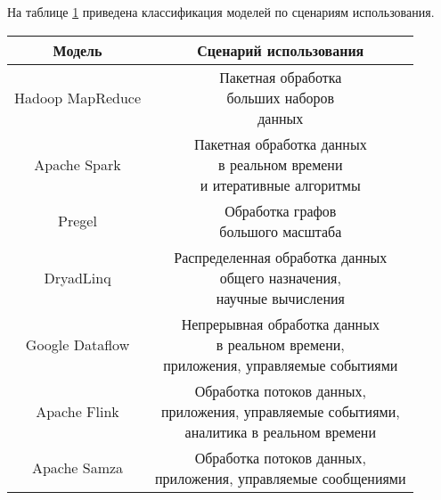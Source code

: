 \clearpage

На таблице \ref{tab:class_models5} приведена классификация моделей по сценариям использования.

\begin{table}[H]\centering
	\captionsetup{justification=raggedright,singlelinecheck=off}
	\label{tab:class_models5}
	\begin{tabular}{|c|c|}
		\hline
		\bfseries Модель 				& \bfseries Сценарий использования \\
		\hline
		Hadoop MapReduce 				& \makecell{Пакетная обработка \\ больших наборов \\ данных} \\
		\hline
		Apache Spark  					& \makecell{Пакетная обработка данных \\ в реальном времени \\ и итеративные алгоритмы} \\
		\hline
		Pregel 									& \makecell{Обработка графов \\ большого масштаба} \\
		\hline
		DryadLinq 							& \makecell{Распределенная обработка данных \\ общего назначения,\\ научные вычисления} \\
		\hline
		Google Dataflow 				& \makecell{Непрерывная обработка данных\\ в реальном времени,\\ приложения, управляемые событиями} \\
		\hline
		Apache Flink 						& \makecell{Обработка потоков данных,\\ приложения, управляемые событиями,\\ аналитика в реальном времени} \\
		\hline
		Apache Samza 						& \makecell{Обработка потоков данных,\\ приложения, управляемые сообщениями} \\
		\hline
	\end{tabular}
\end{table}

